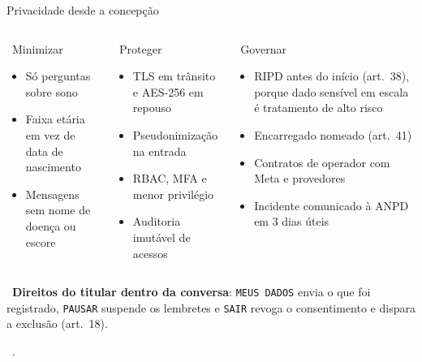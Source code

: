 \documentclass[aspectratio=169,10pt]{beamer}
\newcommand{\fonte}[1]{\par\vfill{\tiny\color{mudo}\faBookOpen\ #1\par}}
\begin{document}
\begin{frame}{Privacidade desde a concepção}
\begin{columns}[T,onlytextwidth]
\begin{block}{\faCompress\ Minimizar}
\scriptsize
\begin{itemize}
  \item Só perguntas sobre sono
  \item Faixa etária em vez de data de nascimento
  \item Mensagens sem nome de doença ou escore
\end{itemize}
\end{block}
\begin{block}{\faLock\ Proteger}
\scriptsize
\begin{itemize}
  \item TLS em trânsito e AES-256 em repouso
  \item Pseudonimização na entrada
  \item RBAC, MFA e menor privilégio
  \item Auditoria imutável de acessos
\end{itemize}
\end{block}
\begin{block}{\faBalanceScale\ Governar}
\scriptsize
\begin{itemize}
  \item RIPD antes do início (art.\ 38), porque dado sensível em escala é tratamento de alto risco
  \item Encarregado nomeado (art.\ 41)
  \item Contratos de operador com Meta e provedores
  \item Incidente comunicado à ANPD em 3 dias úteis
\end{itemize}
\end{block}
\end{columns}
\vfill
\begin{tcolorbox}[colback=menta!8,colframe=menta,boxrule=0.6pt,arc=3pt,left=6pt]
\small\faWhatsapp\ \textbf{Direitos do titular dentro da conversa}:
\texttt{MEUS DADOS} envia o que foi registrado, \texttt{PAUSAR} suspende
os lembretes e \texttt{SAIR} revoga o consentimento e dispara a exclusão
(art.\ 18).
\end{tcolorbox}
\fonte{\textcite{lgpd2018,anpd_res15_2024,anpd_ripd,anpd_res2_2022,anpd_guia_seguranca_2021}.}
\end{frame}
\end{document}
